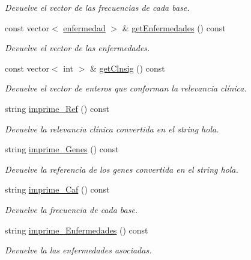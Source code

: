 \begin{DoxyCompactItemize}
\begin{DoxyCompactList}\small\item\em Devuelve el vector de las frecuencias de cada base. \end{DoxyCompactList}\item 
const vector$<$ \hyperlink{classenfermedad}{enfermedad} $>$ \& \hyperlink{classmutacion_a8f3bc020f7c6e93af17b28a4a1063b8b}{get\-Enfermedades} () const 
\begin{DoxyCompactList}\small\item\em Devuelve el vector de las enfermedades. \end{DoxyCompactList}\item 
const vector$<$ int $>$ \& \hyperlink{classmutacion_a4fdd78919fdd449c84dabaa1810b9c7f}{get\-Clnsig} () const 
\begin{DoxyCompactList}\small\item\em Devuelve el vector de enteros que conforman la relevancia clínica. \end{DoxyCompactList}\item 
string \hyperlink{classmutacion_a4c2ec7ccf234628792d4f2f450247987}{imprime\-\_\-\-Ref} () const 
\begin{DoxyCompactList}\small\item\em Devuelve la relevancia clínica convertida en el string hola. \end{DoxyCompactList}\item 
string \hyperlink{classmutacion_a5df2d1f0e01a1564382ef2b2a6698c4a}{imprime\-\_\-\-Genes} () const 
\begin{DoxyCompactList}\small\item\em Devuelve la referencia de los genes convertida en el string hola. \end{DoxyCompactList}\item 
string \hyperlink{classmutacion_a8c5dbbcee194a160fbc771145020d170}{imprime\-\_\-\-Caf} () const 
\begin{DoxyCompactList}\small\item\em Devuelve la frecuencia de cada base. \end{DoxyCompactList}\item 
string \hyperlink{classmutacion_a6bf56c422b637576081096a2e8c47e79}{imprime\-\_\-\-Enfermedades} () const 
\begin{DoxyCompactList}\small\item\em Devuelve la las enfermedades asociadas. \end{DoxyCompactList}\item 

\end{DoxyCompactItemize}

